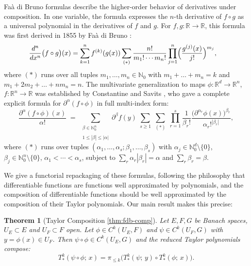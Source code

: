 \documentclass[10pt,a4paper]{article}
\theoremstyle{plain}
\newtheorem{theorem}{Theorem}
\theoremstyle{definition}
\newcommand{\IR}{\mathbb{R}} %
\newcommand{\IN}{\mathbb{N}} %
\newcommand{\del}{\partial} %
\newcommand{\1}{\mathbb{1}} %
\newcommand{\set}[1]{\{#1\}} %
\newcommand{\ssum}[1]{\sum_{\substack{#1}}} %
\begin{document}
Faà di Bruno formulas describe the higher-order behavior of derivatives
under composition. In one variable, the formula expresses the \(n\)-th
derivative of \(f \circ g\) as a universal polynomial in the derivatives
of \(f\) and \(g\). For \(f, g: \IR \to \IR\), this formula was first
derived in 1855 by Faà di Bruno \citep{FaaDiBruno1855}: \[
\begin{aligned}
\frac{d^n}{dx^n}\bigl(f\circ g\bigr)(x)
&=
\sum_{k=1}^n f^{(k)}(g(x))
\ssum{(\ast)}
\frac{n!}{m_1!\cdots m_n!}
\prod_{j=1}^n \Bigl(\frac{g^{(j)}(x)}{j!}\Bigr)^{m_j},
\end{aligned}
\] where \((\ast)\) runs over all tuples \(m_1,\dots,m_n\in\IN_0\) with
\(m_1+\dots+m_n=k\) and \(m_1+2m_2+\dots+nm_n=n\). The multivariate
generalization to maps \(\phi: \IR^d \to \IR^n\), \(f: \IR^n \to \IR\)
was established by Constantine and Savits \citep{CS1996}, who gave a
complete explicit formula for \(\del^\alpha(f \circ \phi)\) in full
multi-index form: \[
  \frac{\del^\alpha(f \circ \phi)(x)}{\alpha!}
  \;=\;
  \ssum{\beta \in \IN_0^n \\\\ 1\le|\beta|\le|\alpha|}
  \del^\beta f(y)\;
  \sum_{s\ge 1}\;
  \sum_{(\ast)}\;
  \prod_{r=1}^s
  \frac{1}{\beta_r!}
  \frac{\big( \del^{\alpha_r}\phi(x) \big)^{\beta_r}}
      {\alpha_r!^{|\beta_r|}},
\] where \((\ast)\) runs over tuples
\((\alpha_1,\dots,\alpha_s; \beta_1,\dots,\beta_s)\) with
\(\alpha_j \in \IN_0^d \setminus \set{0}\),
\(\beta_j \in \IN_0^n \setminus \set{0}\),
\(\alpha_1 < \cdots < \alpha_s\), subject to
\(\sum_r \alpha_r |\beta_r| = \alpha\) and \(\sum_r \beta_r = \beta\).

We give a functorial repackaging of these formulas, following the
philosophy that differentiable functions are functions well approximated
by polynomials, and the composition of differentiable functions should
be well approximated by the composition of their Taylor polynomials. Our
main result makes this precise:

\begin{theorem}[Taylor Composition \ref{thm:fdb-comp}]

Let \(E, F, G\) be Banach spaces, \(U_E \subset E\) and
\(U_F \subset F\) open. Let \(\phi \in C^k(U_E, F)\) and
\(\psi \in C^k(U_F, G)\) with \(y = \phi(x) \in U_F\). Then
\(\psi \circ \phi \in C^k(U_E, G)\) and the reduced Taylor polynomials
compose: \[
  T_{\ast}^k(\psi\circ\phi;\, x) = \pi_{\le k}\bigl(T_{\ast}^k(\psi;\, y) \circ T_{\ast}^k(\phi;\, x)\bigr).
\]

\end{theorem}
\end{document}
